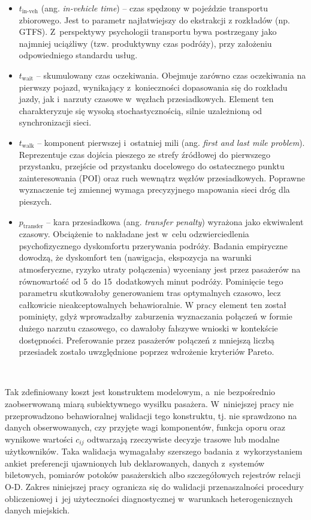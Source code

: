 \documentclass{pracamgr}
\begin{document}
\begin{itemize}
    \item $t_{\text{in-veh}}$ (ang. \textit{in-vehicle time}) -- czas spędzony w pojeździe transportu zbiorowego. Jest to parametr najłatwiejszy do ekstrakcji z rozkładów (np. GTFS). Z~perspektywy psychologii transportu bywa postrzegany jako najmniej uciążliwy (tzw. produktywny czas podróży), przy założeniu odpowiedniego standardu usług.
    \item $t_{\text{wait}}$ -- skumulowany czas oczekiwania. Obejmuje zarówno czas oczekiwania na pierwszy pojazd, wynikający z~konieczności dopasowania się do rozkładu jazdy, jak i~narzuty czasowe w~węzłach przesiadkowych. Element ten charakteryzuje się wysoką stochastycznością, silnie uzależnioną od synchronizacji sieci.
    \item $t_{\text{walk}}$ -- komponent pierwszej i~ostatniej mili (ang. \textit{first and last mile problem}). Reprezentuje czas dojścia pieszego ze strefy źródłowej do pierwszego przystanku, przejście od przystanku docelowego do ostatecznego punktu zainteresowania (POI) oraz ruch wewnątrz węzłów przesiadkowych. Poprawne wyznaczenie tej zmiennej wymaga precyzyjnego mapowania sieci dróg dla pieszych.
    \item $p_{\text{transfer}}$ -- kara przesiadkowa (ang. \textit{transfer penalty}) wyrażona jako ekwiwalent czasowy. Obciążenie to nakładane jest w~celu odzwierciedlenia psychofizycznego dyskomfortu przerywania podróży. Badania empiryczne dowodzą, że dyskomfort ten (nawigacja, ekspozycja na warunki atmosferyczne, ryzyko utraty połączenia) wyceniany jest przez pasażerów na równowartość od 5~do 15~dodatkowych minut podróży. Pominięcie tego parametru skutkowałoby generowaniem tras optymalnych czasowo, lecz całkowicie nieakceptowalnych behawioralnie. W pracy element ten został pominięty, gdyż wprowadzałby zaburzenia wyznaczania połączeń w formie dużego narzutu czasowego, co dawałoby fałszywe wnioski w kontekście dostępności. Preferowanie przez pasażerów połączeń z mniejszą liczbą przesiadek zostało uwzględnione poprzez wdrożenie kryteriów Pareto.

\end{itemize}~\cite{LUO2019102505, metropolitan, capetown, literature_review, review}

Tak zdefiniowany koszt jest konstruktem modelowym, a~nie bezpośrednio zaobserwowaną miarą subiektywnego wysiłku pasażera. W~niniejszej pracy nie przeprowadzono behawioralnej walidacji tego konstruktu, tj. nie sprawdzono na danych obserwowanych, czy przyjęte wagi komponentów, funkcja oporu oraz wynikowe wartości $c_{ij}$ odtwarzają rzeczywiste decyzje trasowe lub modalne użytkowników. Taka walidacja wymagałaby szerszego badania z~wykorzystaniem ankiet preferencji ujawnionych lub deklarowanych, danych z~systemów biletowych, pomiarów potoków pasażerskich albo szczegółowych rejestrów relacji \mbox{O-D}. Zakres niniejszej pracy ogranicza się do walidacji przenaszalności procedury obliczeniowej i~jej użyteczności diagnostycznej w~warunkach heterogenicznych danych miejskich.
\end{document}
